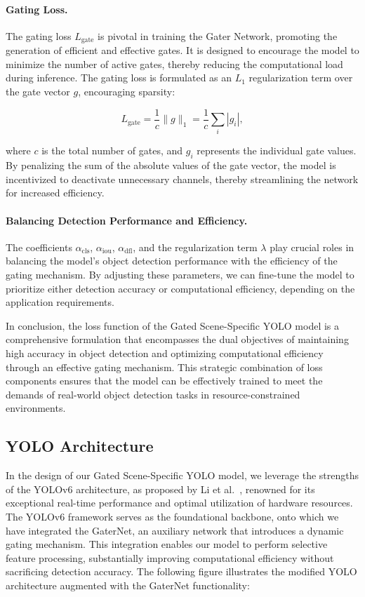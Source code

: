 \paragraph{Gating Loss.} The gating loss \(L_{\text{gate}}\) is pivotal in training the Gater Network, promoting the generation of efficient and effective gates. It is designed to encourage the model to minimize the number of active gates, thereby reducing the computational load during inference. The gating loss is formulated as an \(L_1\) regularization term over the gate vector \(g\), encouraging sparsity:

\begin{equation}
L_{\text{gate}} = \frac{1}{c} \| g \|_1 = \frac{1}{c} \sum_{i} | g_i |,
\label{eq:gate_loss}
\end{equation}

where \(c\) is the total number of gates, and \(g_i\) represents the individual gate values. By penalizing the sum of the absolute values of the gate vector, the model is incentivized to deactivate unnecessary channels, thereby streamlining the network for increased efficiency.

\paragraph{Balancing Detection Performance and Efficiency.} The coefficients \(\alpha_{\text{cls}}\), \(\alpha_{\text{iou}}\), \(\alpha_{\text{dfl}}\), and the regularization term \(\lambda\) play crucial roles in balancing the model's object detection performance with the efficiency of the gating mechanism. By adjusting these parameters, we can fine-tune the model to prioritize either detection accuracy or computational efficiency, depending on the application requirements.

In conclusion, the loss function of the Gated Scene-Specific YOLO model is a comprehensive formulation that encompasses the dual objectives of maintaining high accuracy in object detection and optimizing computational efficiency through an effective gating mechanism. This strategic combination of loss components ensures that the model can be effectively trained to meet the demands of real-world object detection tasks in resource-constrained environments.

\subsection{YOLO Architecture}

In the design of our Gated Scene-Specific YOLO model, we leverage the strengths of the YOLOv6 architecture, as proposed by Li et al.~\cite{li2023yolov6,li2022yolov6}, renowned for its exceptional real-time performance and optimal utilization of hardware resources. The YOLOv6 framework serves as the foundational backbone, onto which we have integrated the GaterNet, an auxiliary network that introduces a dynamic gating mechanism. This integration enables our model to perform selective feature processing, substantially improving computational efficiency without sacrificing detection accuracy. The following figure illustrates the modified YOLO architecture augmented with the GaterNet functionality:

